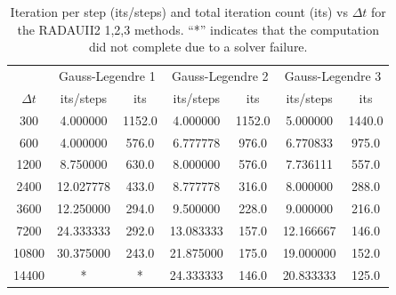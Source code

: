 \documentclass[a4paper, 12pt]{article}
\begin{document}
\begin{table}[h]\centering
    \begin{tabular}{ccccccc}
    & \multicolumn{2}{c}{Gauss-Legendre 1} &
    \multicolumn{2}{c}{Gauss-Legendre 2} &
    \multicolumn{2}{c}{Gauss-Legendre 3} \\ 
   $\Delta t$  &  its/steps  &  its 
   &  its/steps  &  its
   &  its/steps  &  its 
   \\ \hline
300  &              4.000000 & 1152.0 &               4.000000 & 1152.0 &                5.000000 & 1440.0\\
600  &             4.000000 &  576.0 &              6.777778 &  976.0  &              6.770833 &  975.0\\
1200  &             8.750000&   630.0 &              8.000000 &  576.0  &              7.736111 &  557.0\\
2400   &          12.027778 &  433.0  &            8.777778 &  316.0   &            8.000000  & 288.0\\
3600    &        12.250000 &  294.0   &          9.500000 &  228.0    &          9.000000  & 216.0\\
7200     &        24.333333  & 292.0    &       13.083333 &  157.0     &       12.166667  & 146.0\\
10800     &        30.375000 &  243.0    &          21.875000 &  175.0     &       19.000000 &  152.0\\
14400      &     *  & *  &           24.333333 &  146.0     &       20.833333 &  125.0
\end{tabular}
\caption{Iteration per step (its/steps) and total iteration count (its) vs $\Delta t$ for the RADAUII2 1,2,3 methods. ``*'' indicates that the computation did not complete due to a solver failure.}
\label{tab1_niter_vs_dt R}
\end{table}







\end{document}
